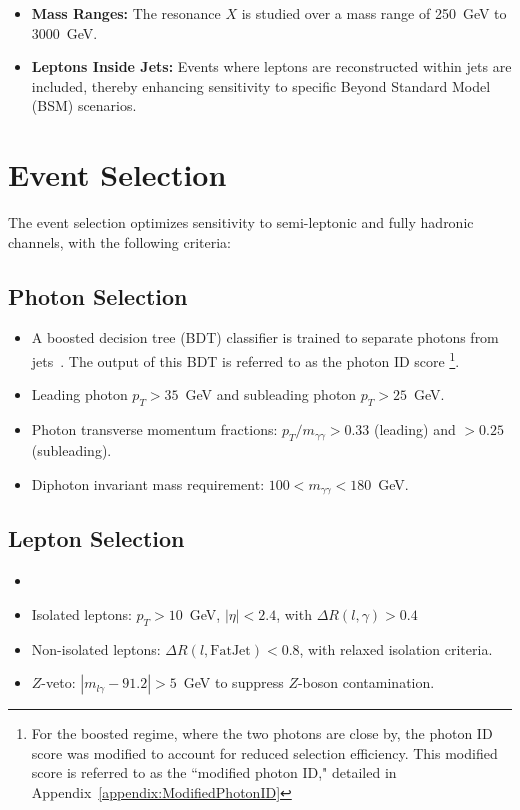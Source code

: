 \begin{itemize}
    \item \textbf{Mass Ranges:}
    The resonance \(X\) is studied over a mass range of 250~GeV to 3000~GeV.

    \item \textbf{Leptons Inside Jets:}
    Events where leptons are reconstructed within jets are included, thereby enhancing sensitivity to specific Beyond Standard Model (BSM) scenarios.
\end{itemize}

\section{Event Selection}


The event selection optimizes sensitivity to semi-leptonic and fully hadronic channels, with the following criteria:

\subsection*{Photon Selection}
\begin{itemize}
    \item A boosted decision tree (BDT) classifier is trained to separate photons from jets~\cite{Sirunyan:2018ouh}.
            The output of this BDT is referred to as the photon ID score
            \footnote{For the boosted regime, where the two photons are close by, the photon ID score was modified to
            account for reduced selection efficiency.
            This modified score is referred to as the ``modified photon ID," detailed in
            Appendix~\ref{appendix:ModifiedPhotonID}}.
    \item Leading photon \(p_T > 35\)~GeV and subleading photon \(p_T > 25\)~GeV.
    \item Photon transverse momentum fractions: \(p_T/m_{\gamma\gamma} > 0.33\) (leading) and \(> 0.25\) (subleading).
    \item Diphoton invariant mass requirement: \(100 < m_{\gamma\gamma} < 180\)~GeV.
\end{itemize}


\subsection*{Lepton Selection}
\begin{itemize}
    \item {}
    \item Isolated leptons: \(p_T > 10\)~GeV, \(|\eta| < 2.4\), with \(\Delta R(l,\gamma) > 0.4\)
    \item Non-isolated leptons: \(\Delta R(l, \text{FatJet}) < 0.8\), with relaxed isolation criteria.
    \item \(Z\)-veto: \(|m_{l\gamma} - 91.2| > 5\)~GeV to suppress \(Z\)-boson contamination.
\end{itemize}

